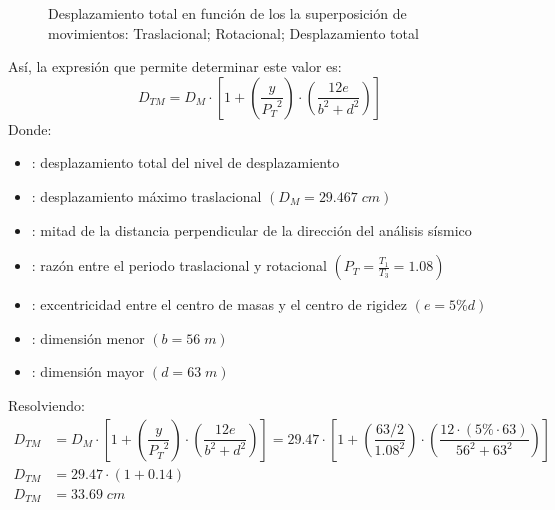 \begin{figure}[h!]
\begin{subfigure}[b]{0.30\linewidth}
        \caption{}
        \label{i1_3.3}
    \end{subfigure}
    \caption[Desplazamiento total en función de los la superposición de movimientos]{Desplazamiento total en función de los la superposición de movimientos:
     Traslacional;
     Rotacional;
     Desplazamiento total
    }
    \label{i1_3}
\end{figure}

Así, la expresión que permite determinar este valor es:
\begin{equation}
    D_{TM} = D_M \cdot \left[ 1 + \left( \dfrac{y}{{P_T}^2} \right) \cdot \left( \dfrac{12e}{b^2 + d^2} \right) \right] \label{eq1_5}
\end{equation}
Donde:
\begin{itemize}
    \item{}: desplazamiento total del nivel de desplazamiento
    \item{}: desplazamiento máximo traslacional $(D_M = 29.467 \; cm)$
    \item{}: mitad de la distancia perpendicular de la dirección del análisis sísmico
    \item{}: razón entre el periodo traslacional y rotacional $\left( P_T = \frac{T_1}{T_3} = 1.08 \right) $
    \item{}: excentricidad entre el centro de masas y el centro de rigidez $(e = 5\% d)$
    \item{}: dimensión menor $(b = 56 \; m)$
    \item{}: dimensión mayor $(d = 63 \; m)$
\end{itemize}
Resolviendo:
\begin{align*}
    D_{TM} &= D_M \cdot \left[ 1 + \left( \dfrac{y}{{P_T}^2} \right) \cdot \left( \dfrac{12e}{b^2 + d^2} \right) \right] = 29.47 \cdot \left[ 1 + \left( \dfrac{63/2}{{1.08}^2} \right) \cdot \left( \dfrac{12 \cdot (5\% \cdot 63)}{56^2 + 63^2} \right) \right] \\
    D_{TM} &= 29.47 \cdot (1 + 0.14) \\
    D_{TM} &= 33.69 \; cm
\end{align*}

